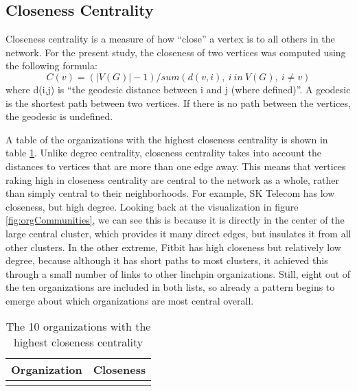 \subsection{Closeness Centrality}
Closeness centrality is a measure of how ``close'' a vertex is to all others in the network. For the present study, the closeness of two vertices was computed using the following formula:
\begin{equation*}
	C(v) = (|V(G)|-1)/sum( d(v,i),\:i\:in\:V(G),\:i \neq v )
\end{equation*}
where d(i,j) is ``the geodesic distance between i and j (where defined)''\cite{butts}. A geodesic is the shortest path between two vertices. If there is no path between the vertices, the geodesic is undefined.  

A table of the organizations with the highest closeness centrality is shown in table \ref{tab:closeness}. Unlike degree centrality, closeness centrality takes into account the distances to vertices that are more than one edge away. This means that vertices raking high in closeness centrality are central to the network as a whole, rather than simply central to their neighborhoods. For example, SK Telecom has low closeness, but high degree. Looking back at the visualization in figure \ref{fig:orgCommunities}, we can see this is because it is directly in the center of the large central cluster, which provides it many direct edges, but insulates it from all other clusters. In the other extreme, Fitbit has high closeness but relatively low degree, because although it has short paths to most clusters, it achieved this through a small number of links to other linchpin organizations. Still, eight out of the ten organizations are included in both lists, so already a pattern begins to emerge about which organizations are most central overall.

\begin{table}
	\begin{tabular}{l|c}%
		\bfseries Organization & \bfseries Closeness%
		\csvreader[head to column names]{closeness.csv}{}%
		{\\\hline\organizationb & \scoreb}%
	\end{tabular}
	\centering
	\caption{The 10 organizations with the highest closeness centrality}\label{tab:closeness}
\end{table}

